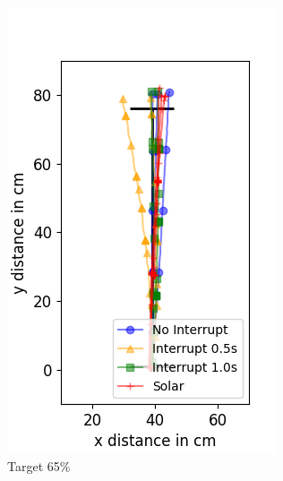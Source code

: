 \begin{figure}
\begin{subfigure}[b]{0.32\textwidth}
		\includegraphics[width=\textwidth]{pics/straight_65.png}
		\caption{Target 65\%}
		\label{fig:stra_exp2}
	\end{subfigure}
	\begin{subfigure}[b]{0.32\textwidth}

\end{subfigure}
\end{figure}
